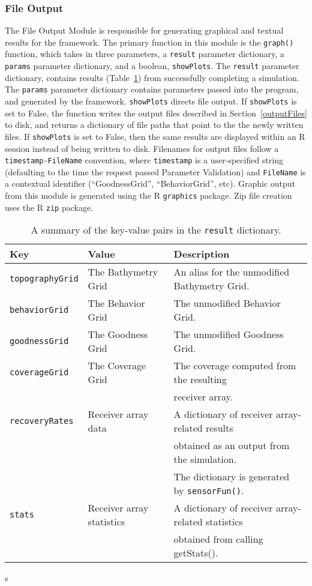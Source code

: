 \subsubsection{File Output}
The File Output Module is responsible for generating graphical and textual results for the framework.  The primary function in this module is the \texttt{graph()} function, which takes in three parameters, a \texttt{result} parameter dictionary, a \texttt{params} parameter dictionary, and a boolean, \texttt{showPlots}.  The \texttt{result} parameter dictionary, contains results (Table~\ref{resultDict}) from successfully completing a simulation.  The \texttt{params} parameter dictionary contains parameters passed into the program, and generated by the framework.  \texttt{showPlots} directs file output.  If \texttt{showPlots} is set to False, the function writes the output files described in Section~\ref{outputFiles} to disk, and returns a dictionary of file paths that point to the the newly written files.  If \texttt{showPlots} is set to False, then the same results are displayed within an R session instead of being written to disk.  Filenames for output files follow a \texttt{timestamp-FileName} convention, where \texttt{timestamp} is a user-specified string (defaulting to the time the request passed Parameter Validation) and \texttt{FileName} is a contextual identifier (``GoodnessGrid'', ``BehaviorGrid'', etc).  Graphic output from this module is generated using the R \texttt{graphics} package.  Zip file creation uses the 
R \texttt{zip} package.

\begin{table}[ht]
	\begin{tabular}{l l l}
		Key	&	Value &	Description\\
		\hline
		\texttt{topographyGrid}	&	The Bathymetry Grid			&	An alias for the unmodified Bathymetry Grid.\\
		\texttt{behaviorGrid}	&	The Behavior Grid			&	The unmodified Behavior Grid.\\
		\texttt{goodnessGrid}	&	The Goodness Grid			&	The unmodified Goodness Grid.\\
		\texttt{coverageGrid}	& 	The Coverage Grid			&	The coverage computed from the resulting\\
								&								&	receiver array.\\
		\texttt{recoveryRates}	& 	Receiver array data			&	A dictionary of receiver array-related results\\
								&								&  obtained as an output from the simulation. \\
								&								&  The dictionary is generated by \texttt{sensorFun()}.\\
		\texttt{stats}			& 	Receiver array statistics	&	A dictionary of receiver array-related statistics\\
								&								&  obtained from calling getStats().\\
	\end{tabular}
	\caption{A summary of the key-value pairs in the \texttt{result} dictionary.
		\label{resultDict}}s
\end{table}

